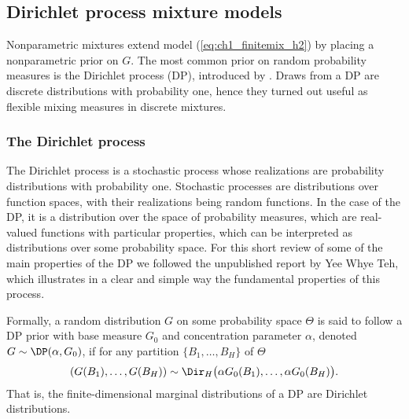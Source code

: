 \subsection{Dirichlet process mixture models}
Nonparametric mixtures extend model (\ref{eq:ch1_finitemix_h2}) by placing a nonparametric prior on $G$. The most common prior on random probability measures is the Dirichlet process (DP), introduced by \citet{ferguson1973, ferguson1974}. Draws from a DP are discrete distributions with probability one, hence they turned out useful as flexible mixing measures in discrete mixtures.

\subsubsection*{The Dirichlet process }
\label{subsec:DP}
The Dirichlet process is a stochastic process whose realizations are probability distributions with probability one. 
Stochastic processes are distributions over function spaces, with their realizations being random functions. In the case of the DP, it is a distribution over the space of probability measures, which are real-valued functions with particular properties, which can be interpreted as distributions over some probability space. For this short review of some of the main properties of the DP we followed the unpublished report by Yee Whye Teh, which illustrates in a clear and simple way the fundamental properties of this process.

Formally, a random distribution $G$ on some probability space $\Theta$ is said to follow a DP prior with base measure $G_0$ and concentration parameter $\alpha$, denoted $G\sim\DP(\alpha,G_0)$, if for any partition $\{B_1,\dots,B_H\}$ of $\Theta$
\begin{equation*}
(G(B_1),\dots,G(B_H)) \sim \Dir_H\big(\alpha G_0(B_1),\dots,\alpha G_0(B_H)\big).
\end{equation*}
That is, the finite-dimensional marginal distributions of a DP are Dirichlet distributions.

